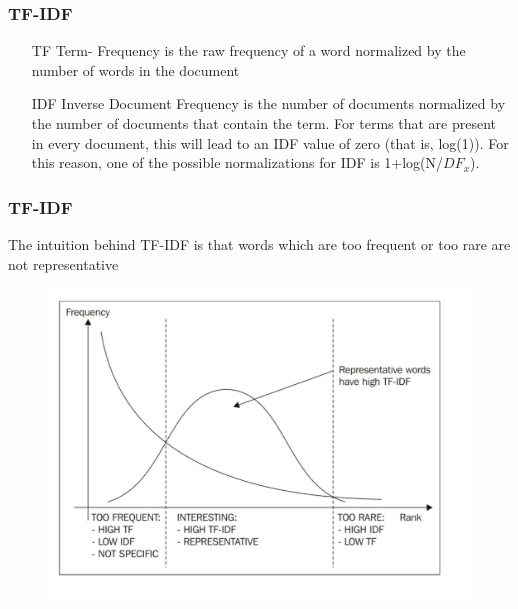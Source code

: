 \documentclass[compress, aspectratio=54]{beamer}
\begin{document}

\begin{frame}
\frametitle{TF-IDF}
\begin{itemize}

\item[TF]  Term- Frequency is the raw frequency of a word normalized by the number of words in the document
\item [IDF] Inverse Document Frequency is the number of documents normalized by the number of documents that contain the term. For terms that are present in every document, this will lead to an IDF value of zero (that is, log(1)). For this reason, one of the possible normalizations for IDF is 1+log(N/$DF_x$).

\end{itemize}

\end{frame}




\begin{frame}
\frametitle{TF-IDF}
The intuition behind TF-IDF is that words which are too frequent or too rare are not representative
\begin{figure}

\includegraphics[width=0.65\linewidth ]{Figures/tf-idf.png}
\end{figure}
\end{frame}
\end{document}
